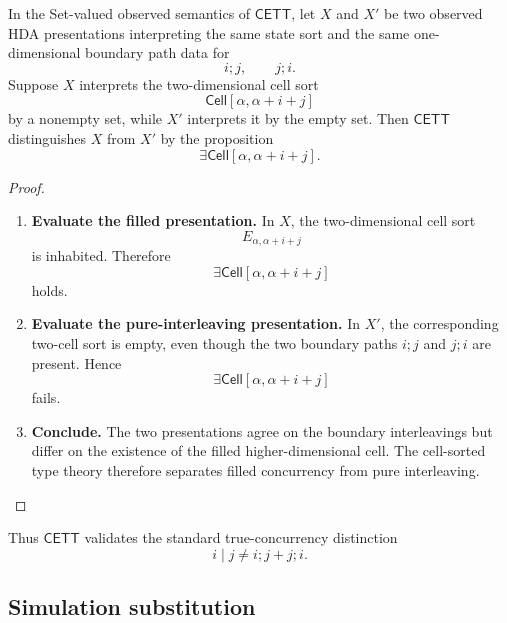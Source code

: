 \begin{theorem}
\label{thm:cmett-filled-cell-separation}
    In the Set-valued observed semantics of \(\mathsf{CETT}\), let \(X\) and
    \(X'\) be two observed HDA presentations interpreting the same state sort
    and the same one-dimensional boundary path data for
    \[
        i;j,
        \qquad
        j;i.
    \]
    Suppose \(X\) interprets the two-dimensional cell sort
    \[
        \mathsf{Cell}[\alpha,\alpha+i+j]
    \]
    by a nonempty set, while \(X'\) interprets it by the empty set. Then
    \(\mathsf{CETT}\) distinguishes \(X\) from \(X'\) by the proposition
    \[
        \exists\mathsf{Cell}[\alpha,\alpha+i+j].
    \]
\end{theorem}

\begin{proof}
    \leavevmode
    \begin{enumerate}
        \item \textbf{Evaluate the filled presentation.}
        In \(X\), the two-dimensional cell sort
        \[
            E_{\alpha,\alpha+i+j}
        \]
        is inhabited. Therefore
        \[
            \exists\mathsf{Cell}[\alpha,\alpha+i+j]
        \]
        holds.

        \item \textbf{Evaluate the pure-interleaving presentation.}
        In \(X'\), the corresponding two-cell sort is empty, even though the
        two boundary paths \(i;j\) and \(j;i\) are present. Hence
        \[
            \exists\mathsf{Cell}[\alpha,\alpha+i+j]
        \]
        fails.

        \item \textbf{Conclude.}
        The two presentations agree on the boundary interleavings but differ
        on the existence of the filled higher-dimensional cell. The
        cell-sorted type theory therefore separates filled concurrency from
        pure interleaving.
    \end{enumerate}
\end{proof}

Thus \(\mathsf{CETT}\) validates the standard true-concurrency distinction
\[
    i\mid j
    \neq
    i;j+j;i.
\]

\subsection{Simulation substitution}
\label{subsec:cmett-simulation-substitution}

